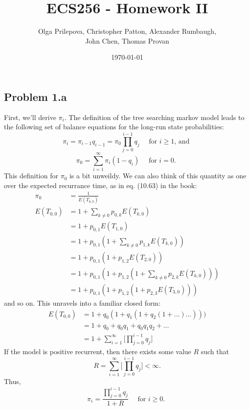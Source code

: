 \documentclass[letter]{article}
\author{Olga Prilepova, Christopher Patton, Alexander Rumbaugh, \\ John Chen, Thomas Provan}
\date{\today}
\title{ECS256 - Homework II}
\begin{document}
\maketitle

\subsection*{Problem 1.a}
First, we'll derive $\pi_i$. The definition of the tree searching markov model leads to the 
following set of balance equations for the long-run state probabilities: 
$$ \pi_i = \pi_{i-1}q_{i-1} = \pi_0 \prod_{j=0}^{i-1}{q_j} \quad \text{ for $i\ge 1$, and } $$
$$ \pi_0 = \sum_{i=1}^\infty{\pi_i(1-q_i)} \quad \text{ for $i=0$. } $$ 
This definition for $\pi_0$ is a bit unweildy. We can also think of this quantity as one 
over the expected recurrance time, as in eq. (10.63) in the book: 
\begin{equation*}
  \begin{aligned}
         \pi_0 &= \frac{1}{E(T_{0,0})} \\ 
    E(T_{0,0}) &= 1 + \sum_{k \ne 0}{p_{0,k}E(T_{k,0})} \\ 
               &= 1 + p_{0,1}E(T_{1,0}) \\
               &= 1 + p_{0,1}(1 + \sum_{k \ne 0}{p_{1,k}E(T_{k,0})}) \\ 
               &= 1 + p_{0,1}(1 + p_{1,2}E(T_{2,0})) \\
               &= 1 + p_{0,1}(1 + p_{1,2}(1 + \sum_{k \ne 0}{p_{2,k}E(T_{k,0})})) \\
               &= 1 + p_{0,1}(1 + p_{1,2}(1 + p_{2,3}E(T_{3,0}))) 
  \end{aligned}
\end{equation*}
and so on. This unravels into a familiar closed form:   
\begin{equation*}
  \begin{aligned}
      E(T_{0,0}) &= 1 + q_0(1 + q_1(1 + q_2(1 + \dots ) \dots ))) \\ 
                 &= 1 + q_0 + q_0q_1 + q_0q_1q_2 + \dots \\
                 &= 1 + \sum_{i=1}^\infty{\big[\prod_{j=0}^{i-1}{q_j}\big]}
  \end{aligned}
\end{equation*}
If the model is positive recurrent, then there exists some value $R$ such that
$$ R = \sum_{i=1}^\infty{\big[\prod_{j=0}^{i-1}{q_j}\big]} < \infty. $$
Thus, 
$$ \pi_i = \frac{\prod_{j=0}^{i-1}{q_j}}{1 + R} \quad \text{ for $i \ge 0$. } $$
\end{document}
